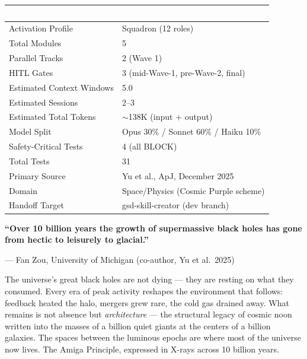 \documentclass[11pt,letterpaper]{article}
\newcommand{\tableheader}[1]{\textbf{\sffamily\textcolor{white}{#1}}}
\begin{document}
\begin{center}
\begin{tabularx}{\textwidth}{L{5cm}X}
\toprule
{}
\tableheader{Metric} & \tableheader{Value} \\
\midrule
Activation Profile & Squadron (12 roles) \\
Total Modules & 5 \\
Parallel Tracks & 2 (Wave 1) \\
HITL Gates & 3 (mid-Wave-1, pre-Wave-2, final) \\
Estimated Context Windows & 5.0 \\
Estimated Sessions & 2--3 \\
Estimated Total Tokens & $\sim$138K (input + output) \\
Model Split & Opus 30\% / Sonnet 60\% / Haiku 10\% \\
Safety-Critical Tests & 4 (all BLOCK) \\
Total Tests & 31 \\
Primary Source & Yu et al., ApJ, December 2025 \\
Domain & Space/Physics (Cosmic Purple scheme) \\
Handoff Target & gsd-skill-creator (dev branch) \\
\bottomrule
\end{tabularx}
\end{center}

\vspace{2em}

\begin{quotebox}
\begin{center}
{\large\sffamily\textcolor{primary}{\textbf{``Over 10 billion years the growth of supermassive black holes has gone from hectic to leisurely to glacial.''}}}

\vspace{0.5em}
{\small\sffamily\textcolor{subtlegray}{--- Fan Zou, University of Michigan (co-author, Yu et al.\ 2025)}}
\end{center}

\vspace{1em}
{\sffamily The universe's great black holes are not dying --- they are resting on what they consumed. Every era of peak activity reshapes the environment that follows: feedback heated the halo, mergers grew rare, the cold gas drained away. What remains is not absence but \emph{architecture} --- the structural legacy of cosmic noon written into the masses of a billion quiet giants at the centers of a billion galaxies. The spaces between the luminous epochs are where most of the universe now lives. The Amiga Principle, expressed in X-rays across 10 billion years.}
\end{quotebox}
\end{document}
